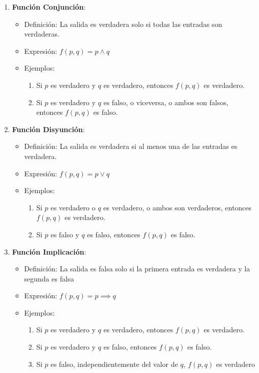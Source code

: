 \begin{enumerate}
	\item \textbf{Función Conjunción}:
	\begin{itemize}
		\item Definición: La salida es verdadera solo si todas las entradas son verdaderas.
		\item Expresión: \( f(p, q) = p \land q \)
		\item Ejemplos:
		\begin{enumerate}
			\item Si $p$ es verdadero y $q$ es verdadero, entonces $f(p, q)$ es verdadero.
			\item Si $p$ es verdadero y $q$ es falso, o viceversa, o ambos son falsos, entonces $f(p, q)$ es falso.
		\end{enumerate}
	\end{itemize}
	
	\item \textbf{Función Disyunción}:
	\begin{itemize}
		\item Definición: La salida es verdadera si al menos una de las entradas es verdadera.
		\item Expresión: \( f(p, q) = p \lor q \)
		\item Ejemplos:
		\begin{enumerate}
			\item Si $p$ es verdadero o $q$ es verdadero, o ambos son verdaderos, entonces $f(p, q)$ es verdadero.
			\item Si $p$ es falso y $q$ es falso, entonces $f(p, q)$ es falso.
		\end{enumerate}
	\end{itemize}
	
	\item \textbf{Función Implicación}:
	\begin{itemize}
		\item Definición: La salida es falsa solo si la primera entrada es verdadera y la segunda es falsa
		\item Expresión: \( f(p, q) = p \implies q  \)
		\item Ejemplos:
		\begin{enumerate}
			\item Si $p$ es verdadero y $q$ es verdadero, entonces $f(p, q)$ es verdadero.
			\item Si $p$ es verdadero y $q$ es falso, entonces $f(p, q)$ es falso.
			\item Si $p$ es falso, independientemente del valor de $q$, $f(p, q)$ es verdadero
		\end{enumerate}
	\end{itemize}
	

\end{enumerate}
